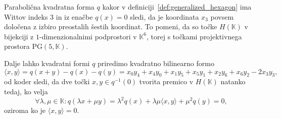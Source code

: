 \documentclass[fin1, tisk]{fmfdelo}
\newcommand{\PG}{\mathrm{PG}}
\begin{document}
\begin{opomba}\label{op:grassmann_sistem}
    Parabolična kvadratna forma $q$ kakor v definiciji~\ref{def:generalized_hexagon} ima Wittov indeks $3$ in 
    iz enačbe $q(x) = 0$ sledi, da je koordinata $x_3$ povsem določena z izbiro preostalih šestih koordinat.
    To pomeni, da so točke $H(\mathbb{K})$ v bijekciji z $1$-dimenzionalnimi podprostori v $\mathbb{K}^6$, torej 
    s točkami projektivnega prostora $\PG(5, \mathbb{K})$. 
    
    Dalje lahko kvadratni formi $q$ priredimo 
    kvadratno bilinearno formo 
    \[\langle x, y\rangle = q(x+y) - q(x) - q(y) = x_0y_4 + x_4y_0 + x_1y_5 + x_5y_1 + x_2y_6 + x_6y_2 - 2x_3y_3,\]
    od koder sledi, da dve točki $x, y \in q^{-1}(0)$ tvorita premico v $H(\mathbb{K})$ natanko tedaj, ko velja
    \[\forall\lambda,\mu\in\mathbb{K}: q(\lambda x + \mu y) = \lambda^2 q(x) + \lambda\mu \langle x, y\rangle + \mu^2 q(y) = 0,\]
    oziroma ko je $\langle x, y\rangle = 0$.


\end{opomba}
\end{document}
